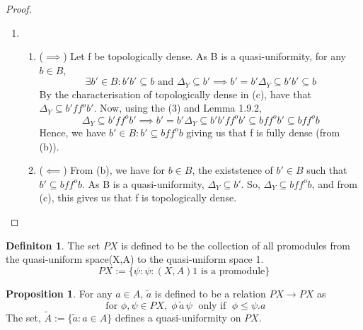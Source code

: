 \documentclass[18pt,a4paper]{article}
\makeatletter
\theoremstyle{definition}
\newtheorem{definition}{Definiton}[section]
\newtheorem{proop}{Proposition}[section]
\newcommand{\carrow}{}%
\DeclareRobustCommand{\carrow}{%
	\mathrel{\vphantom{\rightarrow}\mathpalette\circle@arrow\relax}%
}
\newcommand{\circle@arrow}[2]{%
	\m@th
	\ooalign{%
		\hidewidth$#1\circ\mkern1mu$\hidewidth\cr
	$#1\longrightarrow$\cr}%
}
\makeatother
\begin{document}
\begin{proof}
\begin{enumerate}[label=(\alph*)]
	\item
		\begin{enumerate}[label=(\roman*)]
			\item
				($\implies $) Let f be topologically dense. As B is a quasi-uniformity, for any $b \in B$,
				\begin{equation}\exists b' \in B : b'b' \subseteq b \text{ and } \Delta_Y \subseteq b'
					\implies b'=b'\Delta_Y \subseteq b'b' \subseteq b
				\end{equation}
				By the characterisation of topologically dense in (c), have that $\Delta_Y \subseteq b'f f^o b'$.
				Now, using the (3) and Lemma 1.9.2,
				\[ \Delta_Y \subseteq b'f f^o b' \implies b'=b'\Delta_Y \subseteq b'b'f f^o b' \subseteq bf f^o b'
				\subseteq bf f^o b\]
				Hence, we have $b'\in B : b' \subseteq bf f^o b$ giving us that f is fully dense (from (b)).
			\item ($\impliedby$) From (b), we have for $b \in B$, the existstence of $b' \in B$ such that $
				b' \subseteq bf f^o b$. As B is a quasi-uniformity, $\Delta_Y \subseteq b'$. So,
				$\Delta_Y \subseteq bf f^o b$, and from (c), this gives us that f is topologically dense.
		\end{enumerate}
\end{enumerate}
\end{proof}
\begin{definition}%
	The set $PX$ is defined to be the collection of all promodules from the quasi-uniform space(X,A)
	to the quasi-uniform space 1.
	\[PX:=\{\psi : \psi:(X,A) \carrow 1 \text{ is a promodule} \}\]
\end{definition}
\begin{proop}%
	For any $a\in A$, $\tilde{a}$ is defined to be a relation $PX \to PX$ as
	\[ \text{ for } \phi,\psi \in PX, \; \phi \, \tilde{a} \, \psi \; \text{ only if } \;
	\phi \leq \psi.a \]
	The set, $\tilde{A}:=\{\tilde{a}:a \in A\}$ defines a quasi-uniformity on $PX$.
\end{proop}
\end{document}
